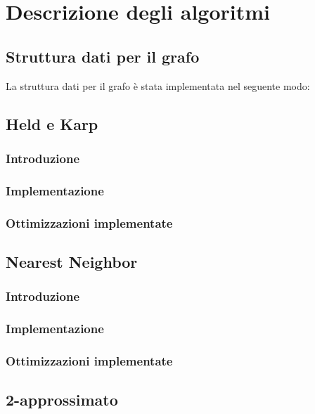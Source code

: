\section{Descrizione degli algoritmi}

\subsection{Struttura dati per il grafo}

La struttura dati per il grafo è stata implementata nel seguente
modo:

\subsection{Held e Karp}

\subsubsection{Introduzione}


\subsubsection{Implementazione}

\subsubsection{Ottimizzazioni implementate}

\subsection{Nearest Neighbor}

\subsubsection{Introduzione}

\subsubsection{Implementazione}

\subsubsection{Ottimizzazioni implementate}

\subsection{2-approssimato}

